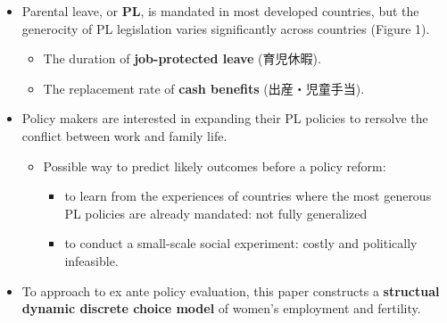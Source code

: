 \documentclass[../root]{subfiles}
\begin{document}
    \begin{itemize}
      \item Parental leave, or \textbf{PL}, is mandated in most developed countries, but the generocity of PL legislation varies significantly across countries (Figure 1).
      \begin{itemize}
        \item The duration of \textbf{job-protected leave} (育児休暇).
        \item The replacement rate of \textbf{cash benefits} (出産・児童手当).
      \end{itemize}
      \item Policy makers are interested in expanding their PL policies to rersolve the conflict between work and family life.
      \begin{itemize}
        \item Possible way to predict likely outcomes before a policy reform:
        \begin{itemize}
          \item to learn from the experiences of countries where the most generous PL policies are already mandated: not fully generalized
          \item to conduct a small-scale social experiment: costly and politically infeasible.
        \end{itemize}
      \end{itemize}
      \item To approach to ex ante policy evaluation, this paper constructs a \textbf{structual dynamic discrete choice model} of women's employment and fertility.
    \end{itemize}
\end{document}
